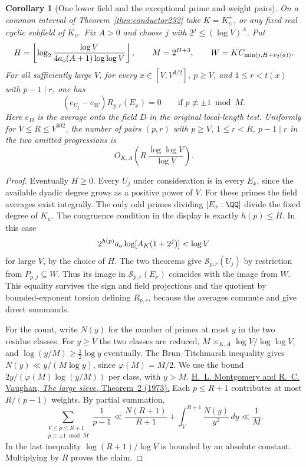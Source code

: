 \documentclass[a4paper,11pt]{article}
\newtheorem{corollary}[proposition]{Corollary}
\theoremstyle{definition}
\theoremstyle{remark}
\numberwithin{equation}{section}
\begin{document}
\begin{corollary}[One lower field and the exceptional prime and weight pairs]
\leavevmode\label{cor:exceptionalweights642}
On a common interval of Theorem~\ref{thm:conductor232} take
\(K=K_\psi^+\), or any fixed real cyclic subfield of \(K_\psi\).
Fix \(A>0\) and choose \(j\) with \(2^j\le(\log V)^A\). Put
\[
 H=\left\lfloor\log_2
        \frac{\log V}{4a_{\rm o}(A+1)\log\log V}\right\rfloor,
 \qquad M=2^{H+3},\qquad W=K C_{\min(j,H+v_2(a))}.
\]
For all sufficiently large \(V\), for every \(x\in[V,V^{3/2}]\),
\(p\ge V\), and \(1\le r<t(x)\) with \(p-1\mid r\), one has
\[
     (e_{U_j}-e_W)R_{p,r}(E_x)=0
                    \qquad\text{if }p\not\equiv\pm1\bmod M .
\]
Here \(e_D\) is the average onto the field \(D\) in the original
local-length test. Uniformly for \(V\le R\le V^{602}\), the
number of pairs \((p,r)\) with \(p\ge V,\ 1\le r<R,\ p-1\mid r\)
in the two omitted progressions is
\[
                  O_{K,A}\!\left(R\,\frac{\log\log V}{\log V}\right).
\]
\end{corollary}
\begin{proof}
Eventually \(H\ge0\). Every \(U_j\) under consideration is in
every \(E_x\), since the available dyadic degree grows as a
positive power of \(V\). For these primes the field averages
exist integrally. The only odd primes dividing \([E_x:\QQ]\)
divide the fixed degree of \(K_\psi\). The congruence condition
in the display is exactly \(h(p)\le H\). In this case
\[
   2^{h(p)}a_{\rm o}\log[A_K(1+2^j)]<\log V
\]
for large \(V\), by the choice of \(H\). The two theorems
give \(\mathcal S_{p,r}(U_j)\) by restriction from
\(P_{p,j}\subseteq W\). Thus its image in
\(\mathcal S_{p,r}(E_x)\) coincides with the image from \(W\).
This equality survives the sign and field projections and
the quotient by bounded-exponent torsion defining \(R_{p,r}\),
because the averages commute and give direct summands.

For the count, write \(N(y)\) for the number of primes at most
\(y\) in the two residue classes. For \(y\ge V\) the two
classes are reduced, \(M\asymp_{K,A}\log V/\log\log V\), and
\(\log(y/M)\ge \tfrac12\log y\) eventually. The
Brun--Titchmarsh inequality gives \(N(y)\ll y/(M\log y)\),
since \(\varphi(M)=M/2\). We use the bound
\(2y/(\varphi(M)\log(y/M))\) per class, with \(y>M\).
\href{https://doi.org/10.1112/S0025579300004708}{H.~L. Montgomery
and R.~C. Vaughan, \emph{The large sieve}, Theorem~2 (1973).}
Each \(p\le R+1\) contributes at most \(R/(p-1)\) weights.
By partial summation,
\[
  \sum_{\substack{V\le p\le R+1\\p\equiv\pm1\bmod M}}\frac1{p-1}
   \ll \frac{N(R+1)}{R+1}
                +\int_V^{R+1}\frac{N(y)}{y^2}\,dy
   \ll \frac1M .
\]
In the last inequality \(\log(R+1)/\log V\) is bounded by
an absolute constant. Multiplying by \(R\) proves the claim.
\end{proof}
\end{document}
